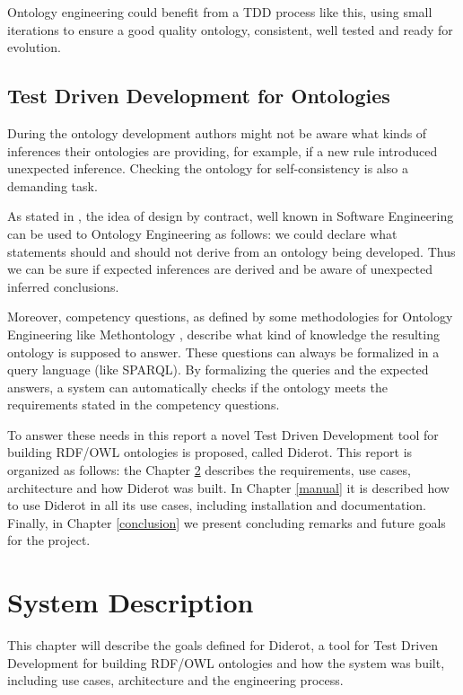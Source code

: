 \documentclass{report}
\begin{document}
Ontology engineering could benefit from a TDD process like this, using small iterations
to ensure a good quality ontology, consistent, well tested and ready for evolution.

\section{Test Driven Development for Ontologies}

During the ontology development authors might not be aware what kinds of inferences their ontologies are
providing, for example, if a new rule introduced unexpected inference. Checking the ontology for
self-consistency is also a demanding task.

As stated in \cite{vrandevcic06}, the idea of design by contract, well known in Software Engineering can
be used to Ontology Engineering as follows: we could declare what statements should and
should not derive from an ontology being developed. Thus we can be sure if expected inferences are
derived and be aware of unexpected inferred conclusions.

Moreover, competency questions, as defined by some methodologies for Ontology Engineering like Methontology \cite{lopez99},
describe what kind of knowledge the resulting ontology is supposed to answer. These questions can always be formalized in
a query language (like SPARQL). By formalizing the queries and the expected answers, a system can automatically checks if
the ontology meets the requirements stated in the competency questions.

To answer these needs in this report a novel Test Driven Development tool for building RDF/OWL ontologies is proposed, called
Diderot. This report is organized as follows: the Chapter \ref{system} describes the requirements, use cases, architecture and
how Diderot was built. In Chapter \ref{manual} it is described how to use Diderot in all its use cases, including installation and
documentation. Finally, in Chapter \ref{conclusion} we present concluding remarks and future goals for the project.

\chapter{System Description}
\label{system}

This chapter will describe the goals defined for Diderot, a tool for Test Driven Development for building RDF/OWL ontologies
and how the system was built, including use cases, architecture and the engineering process.
\end{document}
